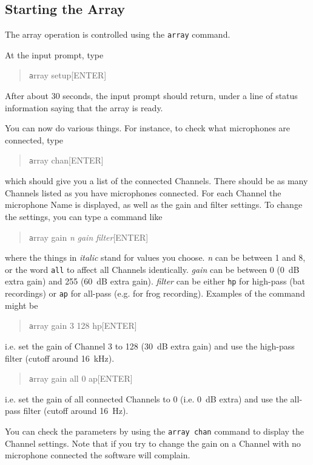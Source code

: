 \documentclass[12pt]{article}
\begin{document}
\subsection{Starting the Array}

The array operation is controlled using the \texttt{array} command.

At the input prompt, type
\begin{quotation}\texttt
      array setup[ENTER]
\end{quotation}
After about 30 seconds, the input prompt should return, under a line
of status information saying that the array is ready.

You can now do various things.  For instance, to check what
microphones are connected, type
\begin{quotation}\texttt
      array chan[ENTER]
\end{quotation}
which should give you a list of the connected Channels.  There should
be as many Channels listed as you have microphones connected.  For
each Channel the microphone Name is displayed, as well as the gain and
filter settings.  To change the settings, you can type a command like
\begin{quotation}\texttt
      array gain \textit{n} \textit{gain} \textit{filter}[ENTER]
\end{quotation}
where the things in \textit{italic} stand for values you choose.
\textit{n} can be between 1 and 8, or the word \texttt{all} to affect
all Channels identically.  \textit{gain} can be between 0 (0~dB extra
gain) and 255 (60~dB extra gain). \textit{filter} can be either
\texttt{hp} for high-pass (bat recordings) or \texttt{ap} for all-pass
(e.g. for frog recording).  Examples of the command might be
\begin{quotation}\texttt
      array gain 3 128 hp[ENTER]
\end{quotation}
i.e. set the gain of Channel 3 to 128 (30~dB extra gain) and use the
high-pass filter (cutoff around 16~kHz).
\begin{quotation}\texttt
      array gain all 0 ap[ENTER]
\end{quotation}
i.e. set the gain of all connected Channels to 0 (i.e. 0~dB extra) and
use the all-pass filter (cutoff around 16~Hz).

You can check the parameters by using the \texttt{array chan} command to
display the Channel settings.  Note that if you try to change the gain
on a Channel with no microphone connected the software will complain.
\end{document}
